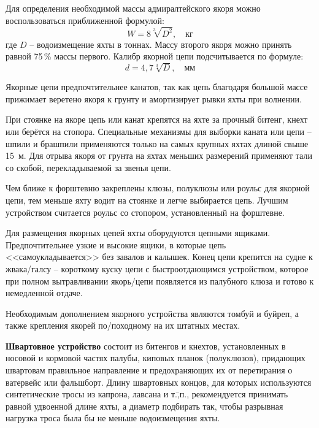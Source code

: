 Для определения необходимой массы адмиралтейского якоря можно
воспользоваться приближенной формулой:
%
\begin{equation}
  W = 8 \sqrt[3]{D^2}, \quad \text{кг}
\end{equation}
%
где $D$ \--- водоизмещение яхты в тоннах. Массу второго якоря можно
принять равной 75\,\% массы первого. Калибр якорной цепи
подсчитывается по формуле:
%
\begin{equation}
  d = 4,7 \sqrt[3]{D}, \quad \text{мм}
\end{equation}

Якорные цепи предпочтительнее канатов, так как цепь благодаря большой
массе прижимает веретено якоря к грунту и амортизирует рывки яхты при
волнении.

При стоянке на якоре цепь или канат крепятся на яхте за прочный
битенг, кнехт или берётся на стопора. Специальные механизмы для
выборки каната или цепи \--- шпили и брашпили применяются только на
самых крупных яхтах длиной свыше 15~м. Для отрыва якоря от грунта на
яхтах меньших размерений применяют тали со скобой, перекладываемой за
звенья цепи.

Чем ближе к форштевню закреплены клюзы, полуклюзы или роульс для
якорной цепи, тем меньше яхту водит на стоянке и легче выбирается
цепь. Лучшим устройством считается роульс со стопором, установленный
на форштевне.

Для размещения якорных цепей яхты оборудуются цепными
ящиками. Предпочтительнее узкие и высокие ящики, в которые цепь
<<самоукладывается>> без завалов и калышек. Конец цепи крепится на
судне к жвака\-/галсу \--- короткому куску цепи с быстроотдающимся
устройством, которое при полном вытравливании якорь\-/цепи появляется
из палубного клюза и готово к немедленной отдаче.

Необходимым дополнением якорного устройства являются томбуй и буйреп,
а также крепления якорей по\-/походному на их штатных местах.

\textbf{Швартовное устройство} состоит из
битенгов и кнехтов, установленных в носовой и кормовой частях палубы,
киповых планок (полуклюзов), придающих швартовам правильное
направление и предохраняющих их от перетирания о ватервейс или
фальшборт. Длину швартовных концов, для которых используются
синтетические тросы из капрона, лавсана и т.\=,п., рекомендуется
принимать равной удвоенной длине яхты, а диаметр подбирать так, чтобы
разрывная нагрузка троса была бы не меньше водоизмещения яхты.

